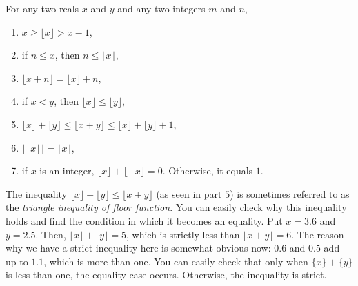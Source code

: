 \documentclass{subfile}
\begin{document}
\begin{proposition} \label{prop:floor}
	For any two reals $x$ and $y$ and any two integers $m$ and $n$,
	\begin{enumerate}[1.]
		\item $x\geq\lfloor x\rfloor>x-1$,
		\item if $n \leq x$, then $n \leq \lfloor x \rfloor$,
		\item $\lfloor x+n\rfloor=\lfloor x\rfloor+n$,
		\item if $x <y$, then $\lfloor x \rfloor \leq \lfloor y \rfloor$,
		\item $\lfloor x\rfloor+\lfloor y \rfloor\leq \lfloor x+y\rfloor \leq \lfloor x\rfloor+\lfloor y\rfloor+1$,
		\item $\lfloor \lfloor x\rfloor\rfloor  =  \lfloor x\rfloor$,
		\item if $x$ is an integer, $\lfloor x\rfloor+\lfloor -x\rfloor=0$. Otherwise, it equals $1$.
	\end{enumerate}
\end{proposition}

\begin{example}
	The inequality $\lfloor x\rfloor+\lfloor y\rfloor \leq \lfloor x+y\rfloor$ (as seen in part $5$) is sometimes referred to as the \textit{triangle inequality of floor function}. You can easily check why this inequality holds and find the condition in which it becomes an equality. Put $x=3.6$ and $y=2.5$. Then, $\lfloor x\rfloor+\lfloor y\rfloor = 5$, which is strictly less than $\lfloor x+y\rfloor=6$. The reason why we have a strict inequality here is somewhat obvious now: $0.6$ and $0.5$ add up to $1.1$, which is more than one. You can easily check that only when $\{x\} + \{y\}$ is less than one, the equality case occurs. Otherwise, the inequality is strict.
\end{example}
\end{document}
